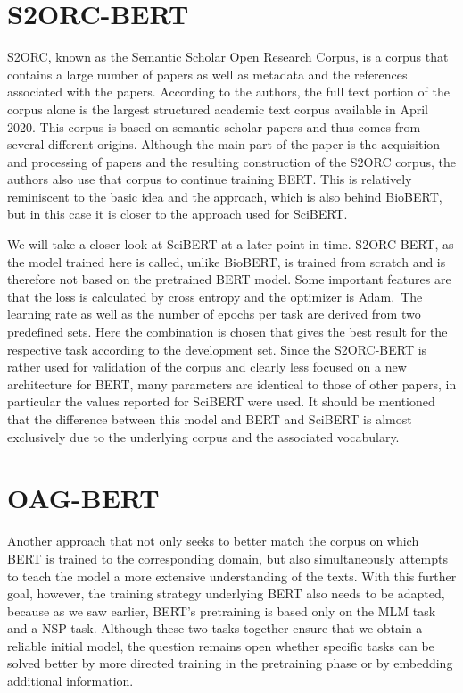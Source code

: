 \section{S2ORC-BERT}
S2ORC, known as the Semantic Scholar Open Research Corpus, is a corpus that contains a large number of papers as well as metadata and the references associated with the papers. According to the authors, the full text portion of the corpus alone is the largest structured academic text corpus available in April 2020. This corpus is based on semantic scholar papers and thus comes from several different origins. Although the main part of the paper is the acquisition and processing of papers and the resulting construction of the S2ORC corpus, the authors also use that corpus to continue training BERT. This is relatively reminiscent to the basic idea and the approach, which is also behind BioBERT, but in this case it is closer to the approach used for SciBERT. 

We will take a closer look at SciBERT at a later point in time. S2ORC-BERT, as the model trained here is called, unlike BioBERT, is trained from scratch and is therefore not based on the pretrained BERT model. Some important features are that the loss is calculated by cross entropy and the optimizer is Adam. The learning rate as well as the number of epochs per task are derived from two predefined sets. Here the combination is chosen that gives the best result for the respective task according to the development set. Since the S2ORC-BERT is rather used for validation of the corpus and clearly less focused on a new architecture for BERT, many parameters are identical to those of other papers, in particular the values reported for SciBERT were used. It should be mentioned that the difference between this model and BERT and SciBERT is almost exclusively due to the underlying corpus and the associated vocabulary.  




\section{OAG-BERT}
	Another approach that not only seeks to better match the corpus on which BERT is trained to the corresponding domain, but also simultaneously attempts to teach the model a more extensive understanding of the texts. With this further goal, however, the training strategy underlying BERT also needs to be adapted, because as we saw earlier, BERT's pretraining is based only on the MLM task and a NSP task. Although these two tasks together ensure that we obtain a reliable initial model, the question remains open whether specific tasks can be solved better by more directed training in the pretraining phase or by embedding additional information.
	
